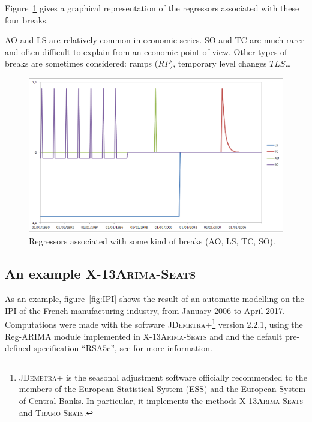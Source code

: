 \documentclass[12pt, a4paper]{article}
\begin{document}
Figure~\ref{fig:Outliers} gives a graphical representation of the regressors associated with these four breaks.

AO and LS are relatively common in economic series. SO and TC are much rarer and often difficult to explain from an economic point of view. Other types of breaks are sometimes considered: ramps ($RP$), temporary level changes $TLS$\dots


\begin{figure}[!ht]
\begin{center}
 \includegraphics[scale=0.65]{img/Outliers.png}
 \caption{Regressors associated with some kind of breaks (AO, LS, TC, SO).}
 \label{fig:Outliers}
\end{center}
\end{figure}


\subsection{An example \textsc{X-13Arima-Seats}}

As an example, figure~\ref{fig:IPI} shows the result of an automatic modelling on the IPI of the French manufacturing industry, from January 2006 to April 2017. Computations were made with the software  \textsc{JDemetra+}\footnote{\textsc{JDemetra+} is the seasonal adjustment software officially recommended to the members of the European Statistical System (ESS) and the European System of Central Banks. In particular, it implements the methods \textsc{X-13Arima-Seats} and \textsc{Tramo-Seats}.} version 2.2.1, using the Reg-ARIMA module implemented in \textsc{X-13Arima-Seats} and and the default pre-defined specification ``RSA5c'', see \cite{G2017} for more information.
\end{document}
